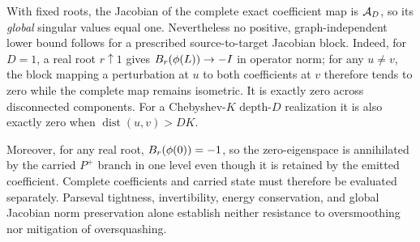 \begin{proposition}
\label{prop:sensitivity-boundary}
With fixed roots, the Jacobian of the complete exact coefficient map is
$\mathcal A_D$, so its \emph{global} singular values equal one.  Nevertheless no
positive, graph-independent lower bound follows for a prescribed
source-to-target Jacobian block.  Indeed, for $D=1$, a real root $r\uparrow1$
gives $B_r(\phi(L))\to-I$ in operator norm; for any $u\neq v$, the block
mapping a perturbation at $u$ to both coefficients at $v$ therefore tends to
zero while the complete map remains isometric.  It is exactly zero across
disconnected components.  For a Chebyshev-$K$ depth-$D$ realization it is
also exactly zero when $\operatorname{dist}(u,v)>DK$.

Moreover, for any real root, $B_r(\phi(0))=-1$, so the zero-eigenspace is
annihilated by the carried $P^+$ branch in one level even though it is retained
by the emitted coefficient.  Complete coefficients and carried state must
therefore be evaluated separately.  Parseval tightness, invertibility,
energy conservation, and global Jacobian norm preservation alone establish
neither resistance to oversmoothing nor mitigation of oversquashing.
\end{proposition}
